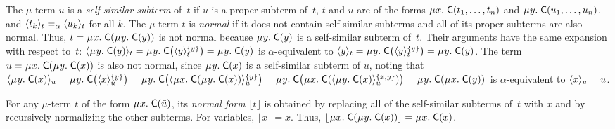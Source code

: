 \documentclass[smallcondensed,draft]{svjour3}
\newcommand\MU{\vvthinspace\mu\vvthinspace}
\newcommand\const[1]{\textsf{#1}}
\renewcommand{\vec}[1]{\bar #1}
\newcommand{\expand}[2]{\langle \smash{#2} \rangle_{#1}}
\newcommand{\nf}[1]{\lfloor#1\rfloor}
\newcommand{\aequiv}{\mathrel{=_\alpha}}
\newcommand{\vsim}{\aequiv}
\newcommand\vvthinspace{\kern+0.041667em}
\newcommand\vthinspace{\kern+0.083333em}
\begin{document}
The $\mu$-term $u$
is a \emph{self-similar subterm} of~$t$ if
$u$ is a proper subterm of~$t$,
$t$ and $u$ are of the forms $\MU x.\; \const{C}( t_1, \ldots, t_n )$
and $\MU y.\; \const{C}( u_1, \ldots, u_n )$,
and $\expand{t}{ t_k } \aequiv \expand{t}{ u_k }$ for all $k$. %
The $\mu$-term $t$ is \emph{normal} if it does not contain %
self-similar subterms
and all of its proper subterms are also normal.
Thus, $t = \MU x.\; \const{C}( \MU y.\; \const{C}( y ) )$ is not normal
because $\MU y.\; \const{C}( y )$ is a self-similar subterm of~$t$.
Their arguments have the same expansion with respect to~$t$:
$\expand{t}{\MU y.\; \const{C}( y )} =
\MU y.\; \const{C}\bigl( \expand{t}{y}^{\smash{\{y\}}} \bigr) =
\MU y.\; \const{C}( y )$
is $\alpha$-equivalent to
$\expand{t}{y} =
\MU y.\; \const{C}\bigl( \expand{t}{y}^{\smash{\{y\}}} \bigr) =
\MU y.\; \const{C}( y )$.
The term $u = \MU x.\; \const{C}( \MU y.\; \const{C}( x ) )$ is also not normal,
since $\MU y.\; \const{C}( x )$ is a self-similar subterm of $u$,
noting that
%
$\expand{u}{\MU y.\; \const{C}( x )}
 = \MU y.\; \const{C}\bigl( \expand{u}{x}^{\smash{\{y\}}} \bigr)
 = \MU y.\; \const{C}\bigl( \expand{u}{\MU x.\allowbreak\; \const{C}( \MU y.\allowbreak\; \const{C}( x ) ) }^{\smash{\{y\}}} \bigr)
 = \MU y.\; \const{C}\bigl( \MU x.\allowbreak\; \const{C}( \expand{u}{\MU y.\allowbreak\; \const{C}( x )}^{\smash{\{x,y\}}} ) \bigr)
 = \MU y.\allowbreak\; \const{C}( \MU x.\allowbreak\; \const{C}( y ) )$
is $\alpha$-equivalent to $\expand{u}{x} = u$.

For any $\mu$-term $t$ of the form $\MU x.\; \const C( \vec u )$,
its \emph{normal form} $\nf{t}$ is obtained
by replacing all of the self-similar subterms of~$t$ with $x$
and by recursively normalizing the other subterms.
For variables, $\nf{x} = x$.
Thus, $\nf{\MU x.\; \const{C}( \MU y.\; \const{C}( x ) )} = \MU x.\; \const{C}( x )$.


\end{document}
